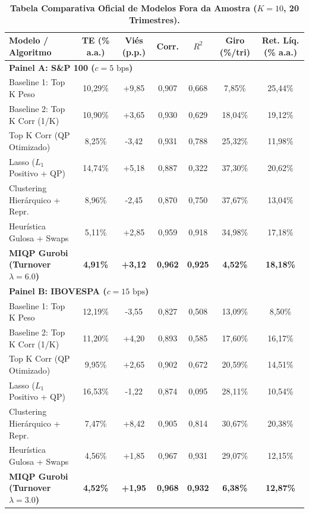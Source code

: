 \documentclass[11pt,a4paper]{article}
\begin{document}
\begin{table}[H]
\centering
\small
\caption{\textbf{Tabela Comparativa Oficial de Modelos Fora da Amostra ($K = 10$, 20 Trimestres).}}
\label{tab:comparativo_oficial}
\begin{tabularx}{\textwidth}{Xcccccc}
\toprule
\textbf{Modelo / Algoritmo} & \textbf{TE (\% a.a.)} & \textbf{Viés (p.p.)} & \textbf{Corr.} & \textbf{$R^2$} & \textbf{Giro (\%/tri)} & \textbf{Ret. Líq. (\% a.a.)} \\
\midrule
\multicolumn{7}{l}{\textbf{Painel A: S\&P 100 ($c = 5\text{ bps}$)}} \\
Baseline 1: Top K Peso & 10,29\% & +9,85 & 0,907 & 0,668 & 7,85\% & 25,44\% \\
Baseline 2: Top K Corr (1/K) & 10,90\% & +3,65 & 0,930 & 0,629 & 18,04\% & 19,12\% \\
Top K Corr (QP Otimizado) & 8,25\% & -3,42 & 0,931 & 0,788 & 25,32\% & 11,98\% \\
Lasso ($L_1$ Positivo + QP) & 14,74\% & +5,18 & 0,887 & 0,322 & 37,30\% & 20,62\% \\
Clustering Hierárquico + Repr. & 8,96\% & -2,45 & 0,870 & 0,750 & 37,67\% & 13,04\% \\
Heurística Gulosa + Swaps & 5,11\% & +2,85 & 0,959 & 0,918 & 34,98\% & 17,18\% \\
\textbf{MIQP Gurobi (Turnover $\lambda=6.0$)} & \textbf{4,91\%} & \textbf{+3,12} & \textbf{0,962} & \textbf{0,925} & \textbf{4,52\%} & \textbf{18,18\%} \\
\midrule
\multicolumn{7}{l}{\textbf{Painel B: IBOVESPA ($c = 15\text{ bps}$)}} \\
Baseline 1: Top K Peso & 12,19\% & -3,55 & 0,827 & 0,508 & 13,09\% & 8,50\% \\
Baseline 2: Top K Corr (1/K) & 11,20\% & +4,20 & 0,893 & 0,585 & 17,60\% & 16,17\% \\
Top K Corr (QP Otimizado) & 9,95\% & +2,65 & 0,902 & 0,672 & 20,59\% & 14,51\% \\
Lasso ($L_1$ Positivo + QP) & 16,53\% & -1,22 & 0,874 & 0,095 & 28,11\% & 10,54\% \\
Clustering Hierárquico + Repr. & 7,47\% & +8,42 & 0,905 & 0,814 & 30,67\% & 20,38\% \\
Heurística Gulosa + Swaps & 4,56\% & +1,85 & 0,967 & 0,931 & 29,07\% & 12,15\% \\
\textbf{MIQP Gurobi (Turnover $\lambda=3.0$)} & \textbf{4,52\%} & \textbf{+1,95} & \textbf{0,968} & \textbf{0,932} & \textbf{6,38\%} & \textbf{12,87\%} \\
\bottomrule
\end{tabularx}
\end{table}
\end{document}
